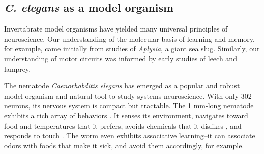 


%







\subsection{\textit{C. elegans} as a model organism}
Invertabrate model organisms have yielded many universal principles of neuroscience.  Our understanding of the molecular basis of learning and memory, for example, came initially from studies of \textit{Aplysia}, a giant sea slug.  Similarly, our understanding of motor circuits was informed by early studies of leech and lamprey. 

The nematode \textit{Caenorhabditis elegans} has emerged as a popular and robust model organism and natural tool to study systems neuroscience. With only 302 neurons, its nervous system is compact but tractable. The 1 mm-long nematode exhibits a rich array of behaviors \citep{croll_components_1975}. It senses its environment,  navigates toward food \cite{grewal_migration_1992}  and temperatures \cite{ryu_thermotaxis_2002} that it prefers,  avoids chemicals that it dislikes \citep{croll_behavoural_1975}, and responds to touch \citep{chalfie_neural_1985}. The worm even exhibits associative learning--it can associate odors with foods that make it sick, and avoid them accordingly, for example\citep{zhang_pathogenic_2005}. 

